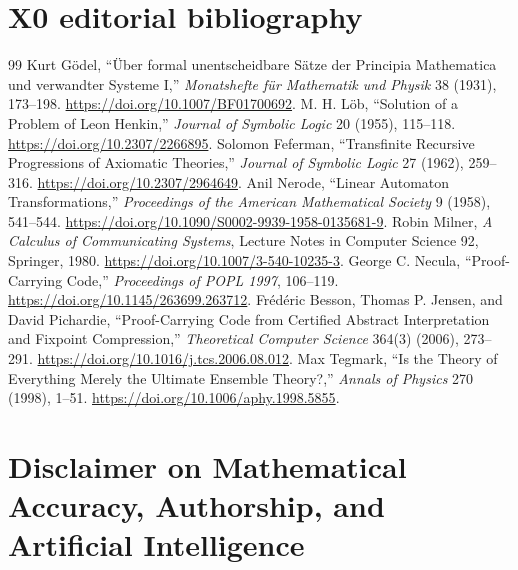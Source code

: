 \documentclass[11pt,letterpaper]{article}
\begin{document}
\section*{X0 editorial bibliography}
\begin{thebibliography}{99}
\small
{} Kurt G{\"o}del, ``{\"U}ber formal unentscheidbare S{\"a}tze der Principia Mathematica und verwandter Systeme I,'' \emph{Monatshefte f{\"u}r Mathematik und Physik} 38 (1931), 173--198. \url{https://doi.org/10.1007/BF01700692}.
 M. H. L{\"o}b, ``Solution of a Problem of Leon Henkin,'' \emph{Journal of Symbolic Logic} 20 (1955), 115--118. \url{https://doi.org/10.2307/2266895}.
 Solomon Feferman, ``Transfinite Recursive Progressions of Axiomatic Theories,'' \emph{Journal of Symbolic Logic} 27 (1962), 259--316. \url{https://doi.org/10.2307/2964649}.
 Anil Nerode, ``Linear Automaton Transformations,'' \emph{Proceedings of the American Mathematical Society} 9 (1958), 541--544. \url{https://doi.org/10.1090/S0002-9939-1958-0135681-9}.
 Robin Milner, \emph{A Calculus of Communicating Systems}, Lecture Notes in Computer Science 92, Springer, 1980. \url{https://doi.org/10.1007/3-540-10235-3}.
 George C. Necula, ``Proof-Carrying Code,'' \emph{Proceedings of POPL 1997}, 106--119. \url{https://doi.org/10.1145/263699.263712}.
 Fr\'{e}d\'{e}ric Besson, Thomas P. Jensen, and David Pichardie, ``Proof-Carrying Code from Certified Abstract Interpretation and Fixpoint Compression,'' \emph{Theoretical Computer Science} 364(3) (2006), 273--291. \url{https://doi.org/10.1016/j.tcs.2006.08.012}.
 Max Tegmark, ``Is the Theory of Everything Merely the Ultimate Ensemble Theory?,'' \emph{Annals of Physics} 270 (1998), 1--51. \url{https://doi.org/10.1006/aphy.1998.5855}.
\end{thebibliography}\clearpage
\hypertarget{disclaimer}{}\section*{Disclaimer on Mathematical Accuracy, Authorship, and Artificial Intelligence}
\end{document}

